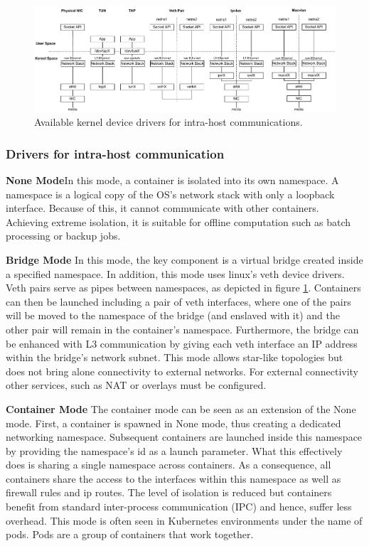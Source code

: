 \documentclass[conference]{IEEEtran}
\begin{document}
\begin{figure}[!t]
\centering
\includegraphics[width=\textwidth]{container_network.drawio.pdf}
\caption{Available kernel device drivers for intra-host communications.}
\label{virtual_networks}
\end{figure}

\subsubsection{Drivers for intra-host communication}\hfill\break
\textbf{None Mode}\hspace{0.2cm}In this mode, a container is isolated into its own namespace. A namespace is a logical copy of the OS’s network stack with only a loopback interface. Because of this, it cannot communicate with other containers. Achieving extreme isolation, it is suitable for offline computation such as batch processing or backup jobs.

\noindent\textbf{Bridge Mode}\hspace{0.2cm} In this mode, the key component is a virtual bridge created inside a specified namespace. In addition, this mode uses linux's veth device drivers. Veth pairs serve as pipes between namespaces, as depicted in figure \ref{virtual_networks}. Containers can then be launched including a pair of veth interfaces, where one of the pairs will be moved to the namespace of the bridge (and enslaved with it) and the other pair will remain in the container's namespace. Furthermore, the bridge can be enhanced with L3 communication by giving each veth interface an IP address within the bridge's network subnet. This mode allows star-like topologies but does not bring alone connectivity to external networks. For external connectivity other services, such as NAT or overlays must be configured. 

\noindent\textbf{Container Mode}\hspace{0.2cm} The container mode can be seen as an extension of the None mode. First, a container is spawned in None mode, thus creating a dedicated networking namespace. Subsequent containers are launched inside this namespace by providing the namespace's id as a launch parameter. What this effectively does is sharing a single namespace across containers. As a consequence, all containers share the access to the interfaces within this namespace as well as firewall rules and ip routes. The level of isolation is reduced but containers benefit from standard inter-process communication (IPC) and hence, suffer less overhead. This mode is often seen in Kubernetes environments under the name of pods. Pods are a group of containers that work together.
\end{document}
